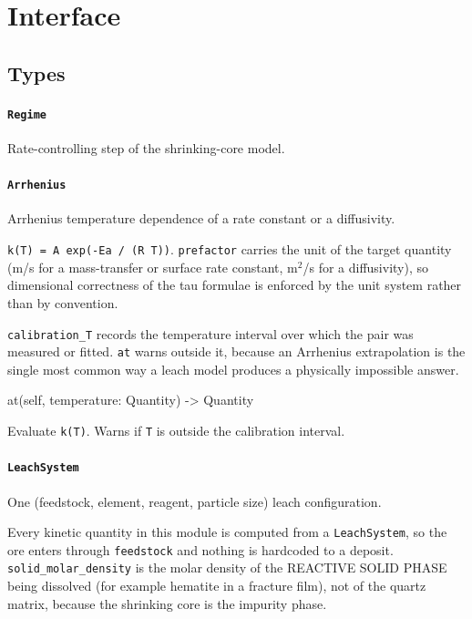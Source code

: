 \documentclass[10pt,a4paper,twoside]{report}
\begin{document}
\section{Interface}

\subsection*{Types}

\paragraph{\texttt{Regime}}

Rate-controlling step of the shrinking-core model.

\paragraph{\texttt{Arrhenius}}

Arrhenius temperature dependence of a rate constant or a diffusivity.

\texttt{k(T) = A exp(-Ea / (R T))}. \texttt{prefactor} carries the unit of the target quantity (m/s for a mass-transfer or surface rate constant, m$^{2}$/s for a diffusivity), so dimensional correctness of the tau formulae is enforced by the unit system rather than by convention.

\texttt{calibration\_T} records the temperature interval over which the pair was measured or fitted. \texttt{at} warns outside it, because an Arrhenius extrapolation is the single most common way a leach model produces a physically impossible answer.

\begin{verbatimsmall}
at(self, temperature: Quantity) -> Quantity
\end{verbatimsmall}

Evaluate \texttt{k(T)}. Warns if \texttt{T} is outside the calibration interval.

\paragraph{\texttt{LeachSystem}}

One (feedstock, element, reagent, particle size) leach configuration.

Every kinetic quantity in this module is computed from a \texttt{LeachSystem}, so the ore enters through \texttt{feedstock} and nothing is hardcoded to a deposit. \texttt{solid\_molar\_density} is the molar density of the REACTIVE SOLID PHASE being dissolved (for example hematite in a fracture film), not of the quartz matrix, because the shrinking core is the impurity phase.
\end{document}
